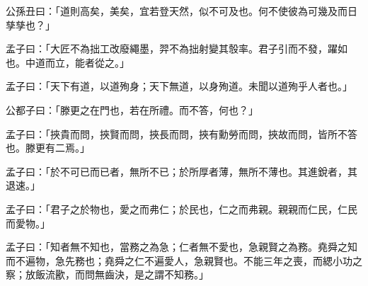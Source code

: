 \begin{pinyinscope}
公孫丑曰：「道則高矣，美矣，宜若登天然，似不可及也。何不使彼為可幾及而日孳孳也？」

孟子曰：「大匠不為拙工改廢繩墨，羿不為拙射變其彀率。君子引而不發，躍如也。中道而立，能者從之。」

孟子曰：「天下有道，以道殉身；天下無道，以身殉道。未聞以道殉乎人者也。」

公都子曰：「滕更之在門也，若在所禮。而不答，何也？」

孟子曰：「挾貴而問，挾賢而問，挾長而問，挾有勳勞而問，挾故而問，皆所不答也。滕更有二焉。」

孟子曰：「於不可已而已者，無所不已；於所厚者薄，無所不薄也。其進銳者，其退速。」

孟子曰：「君子之於物也，愛之而弗仁；於民也，仁之而弗親。親親而仁民，仁民而愛物。」

孟子曰：「知者無不知也，當務之為急；仁者無不愛也，急親賢之為務。堯舜之知而不遍物，急先務也；堯舜之仁不遍愛人，急親賢也。不能三年之喪，而緦小功之察；放飯流歠，而問無齒決，是之謂不知務。」


\end{pinyinscope}